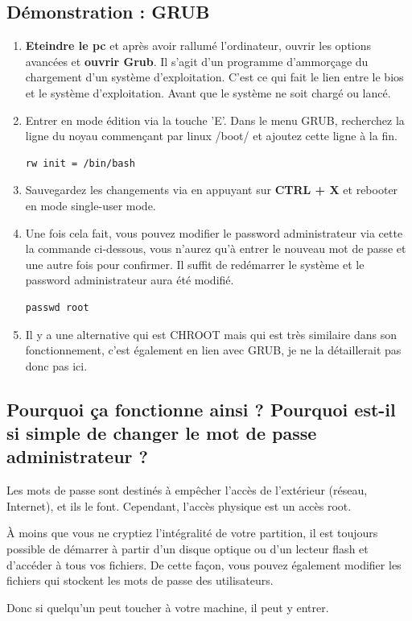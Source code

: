 \documentclass[12pt,a4paper]{article}
\begin{document}
        \subsection{Démonstration : GRUB}
        \begin{enumerate}
        	\item \textbf{Eteindre le pc} et après avoir rallumé l'ordinateur, ouvrir les options avancées et \textbf{ouvrir Grub}. Il s'agit d'un programme d'ammorçage du chargement d'un système d'exploitation. C'est ce qui fait le lien entre le bios et le système d'exploitation. Avant que le système ne soit chargé ou lancé.
        	\item Entrer en mode édition via la touche 'E'. Dans le menu GRUB, recherchez la ligne du noyau commençant par linux /boot/ et ajoutez cette ligne à la fin.
        	\begin{lstlisting}
rw init = /bin/bash
        	\end{lstlisting}
        	\item Sauvegardez les changements via en appuyant sur \textbf{CTRL + X} et rebooter en mode single-user mode.
        	\item Une fois cela fait, vous pouvez modifier le password administrateur via cette la commande ci-dessous, vous n'aurez qu'à entrer le nouveau mot de passe et une autre fois pour confirmer. Il suffit de redémarrer le système et le password administrateur aura été modifié. \cite{grubchangepassword:online}
        	\begin{lstlisting}
passwd root
        	\end{lstlisting}
        \item Il y a une alternative qui est CHROOT mais qui est très similaire dans son fonctionnement, c'est également en lien avec GRUB, je ne la détaillerait pas donc pas ici.
        \end{enumerate}
   \subsection{Pourquoi ça fonctionne ainsi ? Pourquoi est-il si simple de changer le mot de passe administrateur ?} 
   \begin{flushleft}
       \noindent Les mots de passe sont destinés à empêcher l'accès de l'extérieur (réseau, Internet), et ils le font. Cependant, l'accès physique est un accès root.
       \item À moins que vous ne cryptiez l'intégralité de votre partition, il est toujours possible de démarrer à partir d'un disque optique ou d'un lecteur flash et d'accéder à tous vos fichiers. De cette façon, vous pouvez également modifier les fichiers qui stockent les mots de passe des utilisateurs.
       \item Donc si quelqu'un peut toucher à votre machine, il peut y entrer.
   \end{flushleft}
\end{document}
